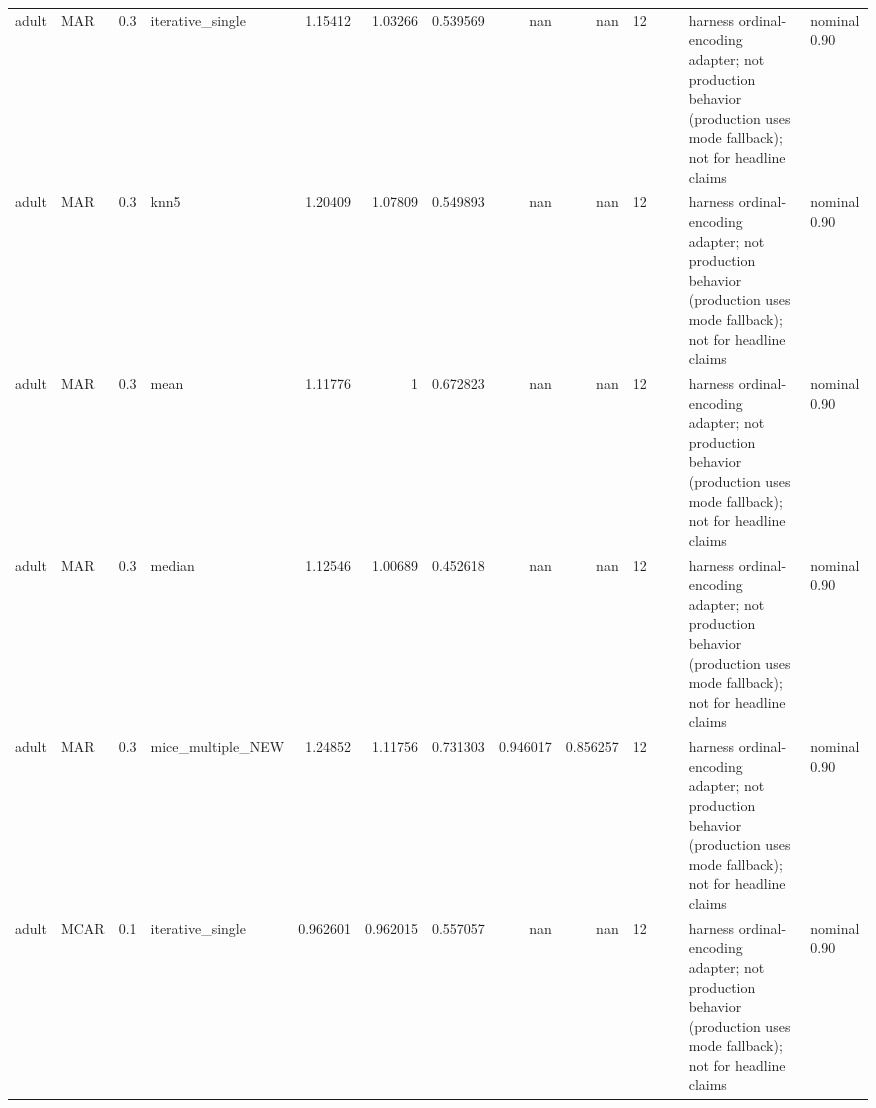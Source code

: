 \begin{table}[ht]
\begin{tabular}{llrlrrrrrrllll}
 adult                & MAR         &         0.3 & iterative\_single  &       1.15412  &             1.03266  &                 0.539569 &                     nan        &                       nan        &        12 &                    &                                         & harness ordinal-encoding adapter; not production behavior (production uses mode fallback); not for headline claims & nominal 0.90              \\
 adult                & MAR         &         0.3 & knn5              &       1.20409  &             1.07809  &                 0.549893 &                     nan        &                       nan        &        12 &                    &                                         & harness ordinal-encoding adapter; not production behavior (production uses mode fallback); not for headline claims & nominal 0.90              \\
 adult                & MAR         &         0.3 & mean              &       1.11776  &             1        &                 0.672823 &                     nan        &                       nan        &        12 &                    &                                         & harness ordinal-encoding adapter; not production behavior (production uses mode fallback); not for headline claims & nominal 0.90              \\
 adult                & MAR         &         0.3 & median            &       1.12546  &             1.00689  &                 0.452618 &                     nan        &                       nan        &        12 &                    &                                         & harness ordinal-encoding adapter; not production behavior (production uses mode fallback); not for headline claims & nominal 0.90              \\
 adult                & MAR         &         0.3 & mice\_multiple\_NEW &       1.24852  &             1.11756  &                 0.731303 &                       0.946017 &                         0.856257 &        12 &                    &                                         & harness ordinal-encoding adapter; not production behavior (production uses mode fallback); not for headline claims & nominal 0.90              \\
 adult                & MCAR        &         0.1 & iterative\_single  &       0.962601 &             0.962015 &                 0.557057 &                     nan        &                       nan        &        12 &                    &                                         & harness ordinal-encoding adapter; not production behavior (production uses mode fallback); not for headline claims & nominal 0.90              \\

\end{tabular}
\end{table}
